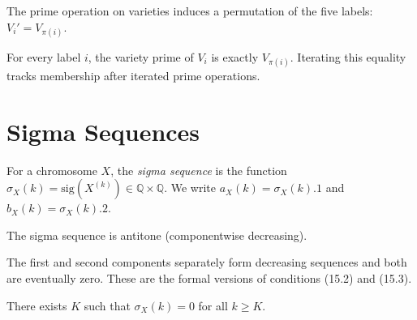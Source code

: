 \begin{definition}
  \label{def:Label.prime}
  \leanok
  The prime operation on varieties induces a permutation of the five labels:
  $V_i' = V_{\pi(i)}$.
\end{definition}

\begin{lemma}
  \label{lem:Variety.Label.prime_eq}
  \leanok
  For every label $i$, the variety prime of $V_i$ is exactly
  $V_{\pi(i)}$.  Iterating this equality tracks membership after iterated
  prime operations.
\end{lemma}


\chapter{Sigma Sequences}

\begin{definition}
  \label{def:Sigma.sigma}
  \leanok
  For a chromosome $X$, the \emph{sigma sequence} is the function
  $\sigma_X(k) = \mathrm{sig}(X^{(k)}) \in \mathbb{Q} \times \mathbb{Q}$.
  We write $a_X(k) = \sigma_X(k).1$ and $b_X(k) = \sigma_X(k).2$.
\end{definition}

\begin{lemma}
  \label{lem:Sigma.antitone}
  \leanok
  The sigma sequence is antitone (componentwise decreasing).
\end{lemma}

\begin{lemma}
  \label{lem:Sigma.cond_15_2_3}
  \leanok
  The first and second components separately form decreasing sequences and
  both are eventually zero.  These are the formal versions of conditions
  (15.2) and (15.3).
\end{lemma}

\begin{lemma}
  \label{lem:Sigma.eventually_zero}
  \leanok
  There exists $K$ such that $\sigma_X(k) = 0$ for all $k \ge K$.
\end{lemma}

